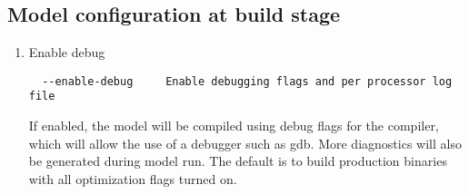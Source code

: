 \subsection{Model configuration at build stage}
\label{modconf}

\begin{enumerate}
\item Enable debug
\begin{Verbatim}
  --enable-debug     Enable debugging flags and per processor log file
\end{Verbatim}
If enabled, the model will be compiled using debug flags for the compiler,
which will allow the use of a debugger such as gdb. More diagnostics will
also be generated during model run.
The default is to build production binaries with all optimization flags
turned on.


\end{enumerate}
